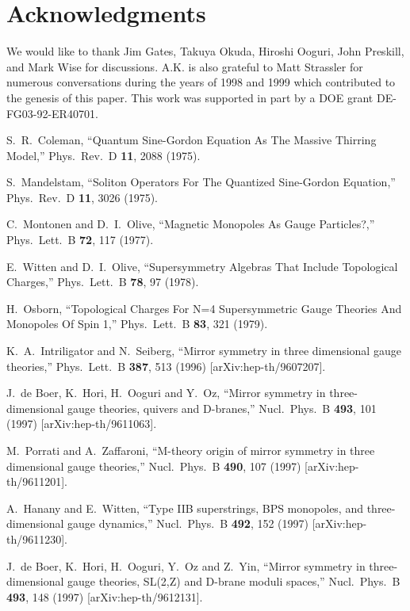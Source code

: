 \documentclass[a4paper,12pt, amsfonts, amssymb]{article}
\begin{document}
\section*{Acknowledgments}
We would like to thank Jim Gates,  Takuya Okuda, Hiroshi Ooguri,
John Preskill, and Mark Wise for discussions. A.K. is also grateful 
to Matt Strassler for numerous conversations during the years of 1998 and 1999 which contributed to the genesis of this paper. This work was supported in part by a DOE grant DE-FG03-92-ER40701.


\begin{thebibliography}{99}


S.~R.~Coleman, ``Quantum Sine-Gordon Equation As The Massive Thirring Model,''
Phys.\ Rev.\ D {\bf 11}, 2088 (1975).

S.~Mandelstam, ``Soliton Operators For The Quantized Sine-Gordon Equation,''
Phys.\ Rev.\ D {\bf 11}, 3026 (1975).

C.~Montonen and D.~I.~Olive,
``Magnetic Monopoles As Gauge Particles?,''
Phys.\ Lett.\ B {\bf 72}, 117 (1977).

E.~Witten and D.~I.~Olive,
``Supersymmetry Algebras That Include Topological Charges,''
Phys.\ Lett.\ B {\bf 78}, 97 (1978).

H.~Osborn,
``Topological Charges For N=4 Supersymmetric Gauge Theories And Monopoles Of Spin 1,'' Phys.\ Lett.\ B {\bf 83}, 321 (1979).

K.~A.~Intriligator and N.~Seiberg,
``Mirror symmetry in three dimensional gauge theories,''
Phys.\ Lett.\ B {\bf 387}, 513 (1996) [arXiv:hep-th/9607207].

J.~de Boer, K.~Hori, H.~Ooguri and Y.~Oz,
``Mirror symmetry in three-dimensional gauge theories, quivers and  D-branes,''
Nucl.\ Phys.\ B {\bf 493}, 101 (1997)
[arXiv:hep-th/9611063].

M.~Porrati and A.~Zaffaroni,
``M-theory origin of mirror symmetry in three dimensional gauge theories,''
Nucl.\ Phys.\ B {\bf 490}, 107 (1997)
[arXiv:hep-th/9611201].

A.~Hanany and E.~Witten, ``Type IIB superstrings, BPS monopoles, and
three-dimensional gauge  dynamics,'' Nucl.\ Phys.\ B {\bf 492}, 152 (1997)
[arXiv:hep-th/9611230].

J.~de Boer, K.~Hori, H.~Ooguri, Y.~Oz and Z.~Yin,
``Mirror symmetry in three-dimensional gauge theories, SL(2,Z) and  D-brane moduli spaces,'' Nucl.\ Phys.\ B {\bf 493}, 148 (1997)
[arXiv:hep-th/9612131].


\end{thebibliography}
\end{document}
